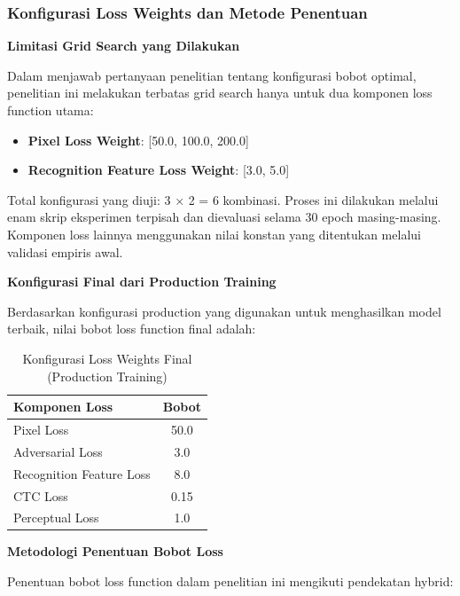 \documentclass[12pt,a4paper]{article}
\begin{document}
\vspace{0.8em}

\subsubsection{Konfigurasi Loss Weights dan Metode Penentuan}
\label{subsubsec:optimasi-loss-weights}

\textbf{Limitasi Grid Search yang Dilakukan}

Dalam menjawab pertanyaan penelitian tentang konfigurasi bobot optimal, penelitian ini melakukan terbatas grid search hanya untuk dua komponen loss function utama:

\begin{itemize}[leftmargin=*]
    \item \textbf{Pixel Loss Weight}: [50.0, 100.0, 200.0]
    \item \textbf{Recognition Feature Loss Weight}: [3.0, 5.0]
\end{itemize}

Total konfigurasi yang diuji: 3 × 2 = 6 kombinasi. Proses ini dilakukan melalui enam skrip eksperimen terpisah dan dievaluasi selama 30 epoch masing-masing. Komponen loss lainnya menggunakan nilai konstan yang ditentukan melalui validasi empiris awal.

\textbf{Konfigurasi Final dari Production Training}

Berdasarkan konfigurasi production yang digunakan untuk menghasilkan model terbaik, nilai bobot loss function final adalah:

\begin{table}[H]
\centering
\caption{Konfigurasi Loss Weights Final (Production Training)}
\label{tab:final-loss-weights}
\begin{tabular}{lc}
\hline
\textbf{Komponen Loss} & \textbf{Bobot} \\
\hline
Pixel Loss & 50.0 \\
Adversarial Loss & 3.0 \\
Recognition Feature Loss & 8.0 \\
CTC Loss & 0.15 \\
Perceptual Loss & 1.0 \\
\hline
\end{tabular}
\end{table}

\textbf{Metodologi Penentuan Bobot Loss}

Penentuan bobot loss function dalam penelitian ini mengikuti pendekatan hybrid:
\end{document}
